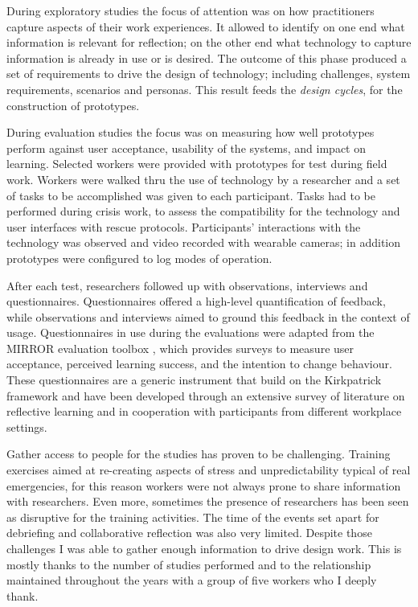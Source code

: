 During exploratory studies the focus of attention was on how practitioners capture aspects of their work experiences. It allowed to identify on one end what information is relevant for reflection; on the other end what technology to capture information is already in use or is desired. The outcome of this phase produced a set of requirements to drive the design of technology; including challenges, system requirements, scenarios and personas. This result feeds the \emph{design cycles}, for the construction of prototypes.

During evaluation studies the focus was on measuring how well prototypes perform against user acceptance, usability of the systems, and impact on learning. Selected workers were provided with prototypes for test during field work. Workers were walked thru the use of technology by a researcher and a set of tasks to be accomplished was given to each participant. Tasks had to be performed during crisis work, to assess the compatibility for the technology and user interfaces with rescue protocols. Participants' interactions with the technology was observed and video recorded with wearable cameras; in addition prototypes were configured to log modes of operation.

After each test, researchers followed up with observations, interviews and questionnaires. Questionnaires offered a high-level quantification of feedback, while observations and interviews aimed to ground this feedback in the context of usage. Questionnaires in use during the evaluations were adapted from the MIRROR evaluation toolbox \autocite{Knipfer:2012vi}, which provides surveys to measure user acceptance, perceived learning success, and the intention to change behaviour. These questionnaires are a generic instrument that build on the Kirkpatrick framework \autocite{kirkpatrick2009evaluating}  and have been developed through an extensive survey of literature on reflective learning and in cooperation with participants from different workplace settings.

Gather access to people for the studies has proven to be challenging. Training exercises aimed at re-creating aspects of stress and unpredictability typical of real emergencies, for this reason workers were not always prone to share information with researchers. Even more, sometimes the presence of researchers has been seen as disruptive for the training activities. The time of the events set apart for debriefing and collaborative reflection was also very limited. Despite those challenges I was able to gather enough information to drive  design work. This is mostly thanks to the number of studies performed and to the relationship maintained throughout the years with a group of five workers who I deeply thank.

